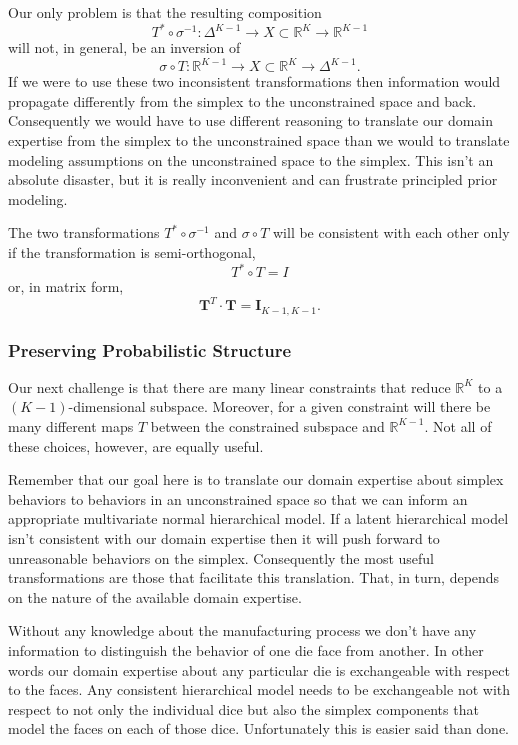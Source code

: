 \documentclass[
  letterpaper,
  DIV=11,
  numbers=noendperiod]{scrartcl}
\begin{document}
Our only problem is that the resulting composition \[
T^{*} \circ \sigma^{-1} :
\Delta^{K - 1} \rightarrow X
\subset \mathbb{R}^{K} \rightarrow \mathbb{R}^{K - 1}
\] will not, in general, be an inversion of \[
\sigma \circ T:
\mathbb{R}^{K - 1} \rightarrow
X \subset \mathbb{R}^{K} \rightarrow \Delta^{K - 1}.
\] If we were to use these two inconsistent transformations then
information would propagate differently from the simplex to the
unconstrained space and back. Consequently we would have to use
different reasoning to translate our domain expertise from the simplex
to the unconstrained space than we would to translate modeling
assumptions on the unconstrained space to the simplex. This isn't an
absolute disaster, but it is really inconvenient and can frustrate
principled prior modeling.

The two transformations \(T^{*} \circ \sigma^{-1}\) and
\(\sigma \circ T\) will be consistent with each other only if the
transformation is semi-orthogonal, \[
T^{*} \circ T = I
\] or, in matrix form, \[
\mathbf{T}^{T} \cdot \mathbf{T} = \mathbf{I}_{K - 1, K - 1}.
\]

\subsubsection{Preserving Probabilistic
Structure}\label{preserving-probabilistic-structure}

Our next challenge is that there are many linear constraints that reduce
\(\mathbb{R}^{K}\) to a \((K - 1)\)-dimensional subspace. Moreover, for
a given constraint will there be many different maps \(T\) between the
constrained subspace and \(\mathbb{R}^{K - 1}\). Not all of these
choices, however, are equally useful.

Remember that our goal here is to translate our domain expertise about
simplex behaviors to behaviors in an unconstrained space so that we can
inform an appropriate multivariate normal hierarchical model. If a
latent hierarchical model isn't consistent with our domain expertise
then it will push forward to unreasonable behaviors on the simplex.
Consequently the most useful transformations are those that facilitate
this translation. That, in turn, depends on the nature of the available
domain expertise.

Without any knowledge about the manufacturing process we don't have any
information to distinguish the behavior of one die face from another. In
other words our domain expertise about any particular die is
exchangeable with respect to the faces. Any consistent hierarchical
model needs to be exchangeable not with respect to not only the
individual dice but also the simplex components that model the faces on
each of those dice. Unfortunately this is easier said than done.
\end{document}
